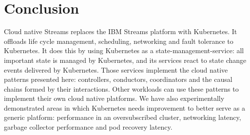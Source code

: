 \section{Conclusion}

Cloud native Streams replaces the IBM Streams platform with Kubernetes. It
offloads life cycle management, scheduling, networking and fault tolerance to
Kubernetes. It does this by using Kubernetes as a state-management-service: all
important state is managed by Kubernetes, and its services react to state change
events delivered by Kubernetes. Those services implement the cloud native
patterns presented here: controllers, conductors, coordinators and the causal
chains formed by their interactions.  Other workloads can use these patterns to
implement their own cloud native platforms. We have also experimentally
demonstrated areas in which Kubernetes needs improvement to better serve as a
generic platform: performance in an oversubscribed cluster, networking latency,
garbage collector performance and pod recovery latency.
